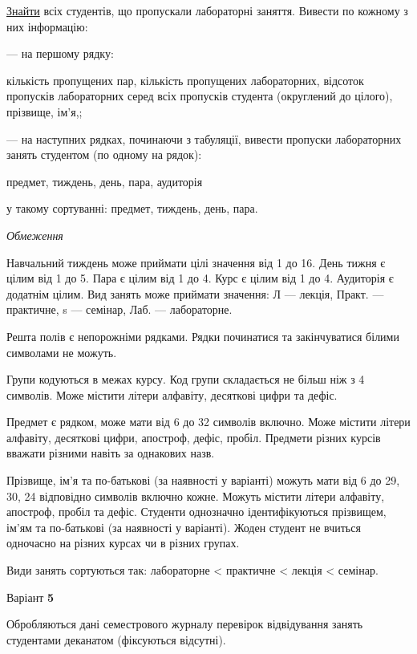 \documentclass[11pt, ukrainian]{article}
\begin{document}
\underline{Знайти} всіх студентів, що пропускали лабораторні заняття. Вивести по кожному з них інформацію:\par
{\noindent}--- на першому рядку:\par
кількість пропущених пар, кількість пропущених лабораторних, відсоток пропусків лабораторних серед всіх пропусків студента (округлений до цілого), прізвище, ім’я,;

{\noindent}--- на наступних рядках, починаючи з табуляції, вивести пропуски лабораторних занять студентом (по одному на рядок):\par
предмет, тиждень, день, пара, аудиторія

{\noindent}у такому сортуванні: предмет, тиждень, день, пара.


\bigskip\textit{Обмеження}

Навчальний тиждень може приймати цілі значення від 1 до 16.
День тижня є цілим від 1 до 5. Пара є цілим від 1 до 4.
Курс є цілим від 1 до 4. Аудиторія є додатнім цілим.
Вид занять може приймати значення:
Л --- лекція, Практ. --- практичне, s --- семінар, Лаб. --- лабораторне.

Решта полів є непорожніми рядками.
Рядки починатися та закінчуватися білими символами не можуть.

Групи кодуються в межах курсу.
Код групи складається не більш ніж з 4 символів.
Може містити літери алфавіту, десяткові цифри та дефіс.

Предмет є рядком, може мати від 6 до 32 символів включно.
Може містити літери алфавіту, десяткові цифри, апостроф, дефіс, пробіл.
Предмети різних курсів вважати різними навіть за однакових назв.

Прізвище, ім’я та по-батькові (за наявності у варіанті)
можуть мати від 6 до 29, 30, 24 відповідно символів включно кожне.
Можуть містити літери алфавіту, апостроф, пробіл та дефіс.
Студенти однозначно ідентифікуються прізвищем, ім’ям та по-батькові (за наявності у варіанті).
Жоден студент не вчиться одночасно на різних курсах чи в різних групах.

Види занять сортуються так: лабораторне < практичне < лекція < семінар.



\par
\newpage
{\center Варіант  \No \textbf { 5 }\par}
\bigskip
Обробляються дані семестрового журналу перевірок відвідування занять студентами деканатом (фіксуються відсутні). 
\end{document}

